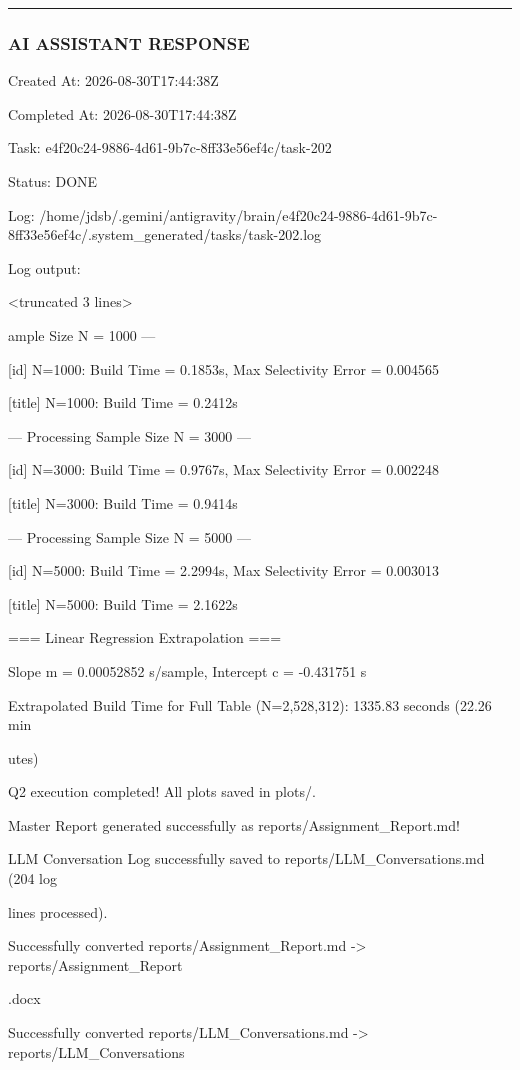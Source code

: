 \documentclass[11pt,a4paper]{article}
\begin{document}
{\hrule

\subsubsection{AI ASSISTANT RESPONSE}

Created At: 2026-08-30T17:44:38Z

Completed At: 2026-08-30T17:44:38Z

Task: e4f20c24-9886-4d61-9b7c-8ff33e56ef4c/task-202

Status: DONE

Log: /home/jdsb/.gemini/antigravity/brain/e4f20c24-9886-4d61-9b7c-8ff33e56ef4c/.system\_generated/tasks/task-202.log

Log output:

<truncated 3 lines>

ample Size N = 1000 ---

[id] N=1000: Build Time = 0.1853s, Max Selectivity Error = 0.004565

[title] N=1000: Build Time = 0.2412s


--- Processing Sample Size N = 3000 ---

[id] N=3000: Build Time = 0.9767s, Max Selectivity Error = 0.002248

[title] N=3000: Build Time = 0.9414s


--- Processing Sample Size N = 5000 ---

[id] N=5000: Build Time = 2.2994s, Max Selectivity Error = 0.003013

[title] N=5000: Build Time = 2.1622s

=== Linear Regression Extrapolation ===

Slope m = 0.00052852 s/sample, Intercept c = -0.431751 s

Extrapolated Build Time for Full Table (N=2,528,312): 1335.83 seconds (22.26 min

utes)

Q2 execution completed! All plots saved in plots/.

Master Report generated successfully as reports/Assignment\_Report.md!

LLM Conversation Log successfully saved to reports/LLM\_Conversations.md (204 log

lines processed).

Successfully converted reports/Assignment\_Report.md -> reports/Assignment\_Report

.docx

Successfully converted reports/LLM\_Conversations.md -> reports/LLM\_Conversations

}
\end{document}
